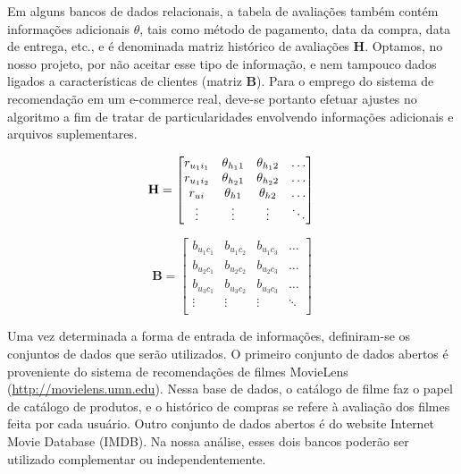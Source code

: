Em alguns bancos de dados relacionais, a tabela de avaliações também contém informações adicionais $\theta$, tais como método de pagamento, data da compra, data de entrega, etc., e é denominada matriz histórico de avaliações $\mathbf{H}$. Optamos, no nosso projeto, por não aceitar esse tipo de informação, e nem tampouco dados ligados a características de clientes (matriz $\mathbf{B}$). Para o emprego do sistema de recomendação em um e-commerce real, deve-se portanto efetuar ajustes no algoritmo a fim de tratar de particularidades envolvendo informações adicionais e arquivos suplementares.

\begin{equation} 
\mathbf{H} =
\begin{bmatrix} 
 r_{u_1 i_1} &  \theta_{h_1 1} &  \theta_{h_1 2} & \dots   \\
 r_{u_1 i_2} &  \theta_{h_2 1} &  \theta_{h_2 2} & \dots   \\
 r_{u i} &  \theta_{h 1} &  \theta_{h 2} & \dots   \\
 \vdots &  \vdots &  \vdots  & \ddots   \\
 \end{bmatrix} \\
\end{equation}

\begin{equation}
	\mathbf{B} = 
\begin{bmatrix} 
 b_{u_1 c_1} &  b_{u_1 c_2} &  b_{u_1 c_3}  & \dots   \\
 b_{u_2 c_1} &  b_{u_2 c_2} &  b_{u_2 c_3}  & \dots   \\
 b_{u_3 c_1} &  b_{u_3 c_2} &  b_{u_3 c_3}  & \dots  \\ 
 \vdots &  \vdots &  \vdots  & \ddots   \\
 \end{bmatrix}
\end{equation}

Uma vez determinada a forma de entrada de informações, definiram-se os conjuntos de dados que serão utilizados. O primeiro conjunto de dados abertos é proveniente do sistema de recomendações de filmes MovieLens (\url{http://movielens.umn.edu}). Nessa base de dados, o catálogo de filme faz o papel de catálogo de produtos, e o histórico de compras se refere à avaliação dos filmes feita por cada usuário. Outro conjunto de dados abertos é do website Internet Movie Database (IMDB). Na nossa análise, esses dois bancos poderão ser utilizado complementar ou independentemente.

